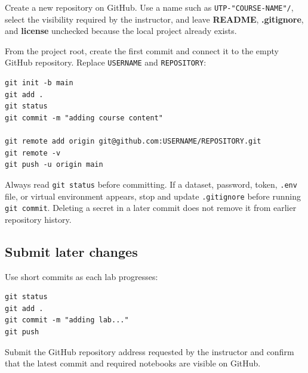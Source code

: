 Create a new repository on GitHub. Use a name such as \texttt{UTP-"COURSE-NAME"/}, select the visibility required by the instructor, and leave \textbf{README}, \textbf{.gitignore}, and \textbf{license} unchecked because the local project already exists.

From the project root, create the first commit and connect it to the empty
GitHub repository. Replace \texttt{USERNAME} and \texttt{REPOSITORY}:

\clearpage
\begin{lstlisting}[style=utpterminal]
git init -b main
git add .
git status
git commit -m "adding course content"

git remote add origin git@github.com:USERNAME/REPOSITORY.git
git remote -v
git push -u origin main
\end{lstlisting}

\begin{pitfall}
Always read \texttt{git status} before committing. If a dataset, password,
token, \texttt{.env} file, or virtual environment appears, stop and update
\texttt{.gitignore} before running \texttt{git commit}. Deleting a secret in a
later commit does not remove it from earlier repository history.
\end{pitfall}

\subsection{Submit later changes}

Use short commits as each lab progresses:

\begin{lstlisting}[style=utpterminal]
git status
git add .
git commit -m "adding lab..."
git push
\end{lstlisting}

Submit the GitHub repository address requested by the instructor and confirm that the latest commit and required notebooks are visible on GitHub.